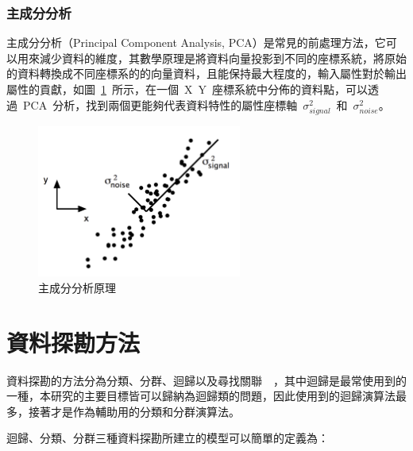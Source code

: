 \subsubsection{主成分分析}

主成分分析（Principal Component Analysis, PCA）是常見的前處理方法，它可以用來減少資料的維度，其數學原理是將資料向量投影到不同的座標系統，將原始的資料轉換成不同座標系的的向量資料，且能保持最大程度的，輸入屬性對於輸出屬性的貢獻，如圖~\ref{fig:pca}\cite{ben2013pca}~所示，在一個~X~Y~座標系統中分佈的資料點，可以透過~PCA~分析，找到兩個更能夠代表資料特性的屬性座標軸~$\sigma^2_{signal}$~和~$\sigma^2_{noise}$。

\begin{figure}[hbtp]
  \begin{center}
    \includegraphics[width=0.6\textwidth]{figures/pca.png}
    \caption{主成分分析原理} 
    \label{fig:pca}
  \end{center}
\end{figure}



\section{資料探勘方法}

資料探勘的方法分為分類、分群、迴歸以及尋找關聯~\cite{fayyad1996data}~，其中迴歸是最常使用到的一種，本研究的主要目標皆可以歸納為迴歸類的問題，因此使用到的迴歸演算法最多，接著才是作為輔助用的分類和分群演算法。

迴歸、分類、分群三種資料探勘所建立的模型可以簡單的定義為：

